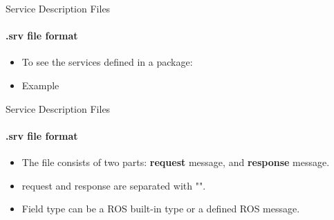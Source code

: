 \documentclass{beamer}
\begin{document}
\begin{frame}{Service Description Files}
    \framesubtitle{.srv file format}
    \begin{itemize}
        \item To see the services defined in a package:
        \begin{terminal}
            \color{green} 
        \end{terminal} 
        
        \item Example
        \begin{terminal}
            \color{green} 
        \end{terminal} 
    \end{itemize}      
\end{frame}

\begin{frame}{Service Description Files}
    \framesubtitle{.srv file format}
    \begin{itemize}
        \item The file consists of two parts: \textbf{request} message, and \textbf{response} message.
        \item request and response are separated with "\ttfamily{\textemdash\textemdash\textemdash}".
        \begin{focus}
        \end{focus}
    \end{itemize} 
    \begin{itemize}
        \item Field type can be a ROS built-in type or a defined ROS message.  
    \end{itemize}    
     
\end{frame}
\end{document}
